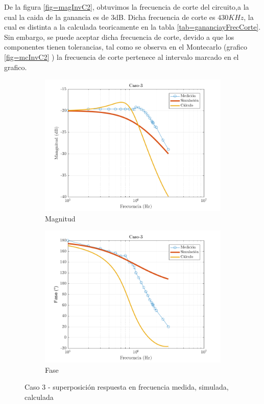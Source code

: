 \documentclass[../../main.tex]{subfiles}
\begin{document}
De la figura \ref{fig=magInvC2}, obtuvimos la frecuencia de corte del circuito,a la cual la caida de la ganancia es de 3dB. Dicha frecuencia de corte es $430KHz$, la cual es distinta a la calculada teoricamente en la tabla \ref{tab=gananciayFrecCorte}. Sin embargo, se puede aceptar dicha frecuencia de corte, devido a que los componentes tienen tolerancias, tal como se observa en el Montecarlo (grafico  \ref{fig=mcInvC2} ) la frecuencia de corte pertenece al intervalo marcado en el grafico.

\begin{figure}[H]
\centering
\begin{subfigure}[http]{0.49\textwidth}
\includegraphics[width=\textwidth]{Caso-3_mag_inv}
\caption{Magnitud}\label{fig=magInvC3}
\end{subfigure}
\begin{subfigure}[http]{0.49\textwidth}
\includegraphics[width=\textwidth]{Caso-3_fase_inv}
\caption{Fase} \label{fig=fasInvC3}
\end{subfigure}
\caption{Caso 3 - superposición respuesta en  frecuencia medida, simulada, calculada}
\end{figure}
\end{document}
